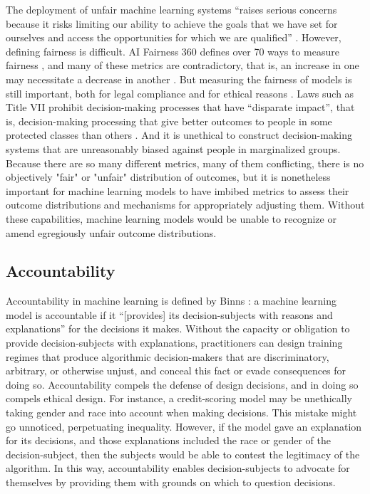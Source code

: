 \documentclass[letterpaper]{article}
\newcommand{\citep}[1]{\cite{#1}}
\begin{document}
The deployment of unfair machine learning systems ``raises serious concerns because it risks limiting our ability to achieve the goals that we have set for ourselves and access the opportunities for which we are qualified'' \citep{Barocas2019}. However, defining fairness is difficult. AI Fairness 360 defines over 70 ways to measure fairness \citep{Bellamy2018}, and many of these metrics are contradictory, that is, an increase in one may necessitate a decrease in another \citep{Kleinberg2016}. But measuring the fairness of models is still important, both for legal compliance \citep{Barocas2016} and for ethical reasons \citep{Binns2018}. Laws such as Title VII prohibit decision-making processes that have ``disparate impact'', that is, decision-making processing that give better outcomes to people in some protected classes than others \citep{Barocas2016}. And it is unethical to construct decision-making systems that are unreasonably biased against people in marginalized groups. Because there are so many different metrics, many of them conflicting, there is no objectively "fair" or "unfair" distribution of outcomes, but it is nonetheless important for machine learning models to have imbibed metrics to assess their outcome distributions and mechanisms for appropriately adjusting them. Without these capabilities, machine learning models would be unable to recognize or amend egregiously unfair outcome distributions. 

\subsection{Accountability}
Accountability in machine learning is defined by Binns : a machine learning model is accountable if it ``[provides] its decision-subjects with reasons and explanations'' for the decisions it makes. Without the capacity or obligation to provide decision-subjects with explanations, practitioners can design training regimes that produce algorithmic decision-makers that are discriminatory, arbitrary, or otherwise unjust, and conceal this fact or evade consequences for doing so. Accountability compels the defense of design decisions, and in doing so compels ethical design. For instance, a credit-scoring model may be unethically taking gender and race into account when making decisions. This mistake might go unnoticed, perpetuating inequality. However, if the model gave an explanation for its decisions, and those explanations included the race or gender of the decision-subject, then the subjects would be able to contest the legitimacy of the algorithm. In this way, accountability enables decision-subjects to advocate for themselves by providing them with grounds on which to question decisions.
\end{document}

